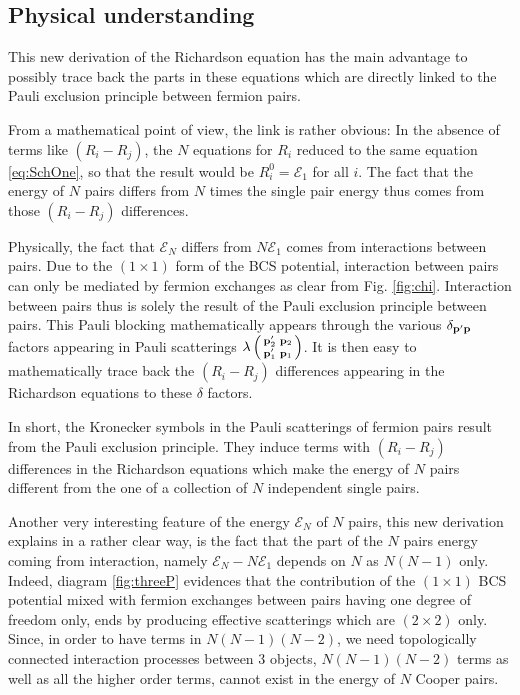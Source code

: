 \documentclass[aps,prb,amsmath,amssymb,preprint,superscriptaddress]{revtex4-1}
\renewcommand{\E}{\ensuremath{\mathcal{E}}}
\begin{document}
\subsection{Physical understanding}
This new derivation of the Richardson equation has the main advantage to possibly trace back the parts in these equations which are directly linked to the Pauli exclusion principle between fermion pairs. 

From a mathematical point of view, the link is rather obvious: In the absence of terms like $(R_i-R_j)$, the $N$ equations for $R_i$ reduced to the same equation \eqref{eq:SchOne}, so that the result would be $R^0_i=\E_1$ for all $i$.  The fact that the energy of $N$ pairs differs from $N$ times the single pair energy thus comes from those $(R_i-R_j)$ differences. 

Physically, the fact that $\E_N$ differs from $N\E_1$ comes from interactions between pairs. Due to the $(1\times1)$ form of the BCS potential, interaction between pairs can only be mediated by fermion exchanges as clear from Fig. \ref{fig:chi}.  Interaction between pairs thus is solely the result of the Pauli exclusion principle between pairs. This Pauli blocking mathematically appears through the various $\delta_{\mathbf{p}'\mathbf{p}}$ factors appearing in Pauli scatterings 
$\lambda\left(\begin{smallmatrix}\mathbf{p}'_2&\mathbf{p}_2\\\mathbf{p}_1'&\mathbf{p}_1\end{smallmatrix}\right)$.  It is then easy to mathematically trace back the  $(R_i-R_j)$ differences appearing in the Richardson equations to these $\delta$ factors. 

In short, the Kronecker symbols in the Pauli scatterings of  fermion pairs result from the Pauli exclusion principle.  They induce terms with $(R_i-R_j)$ differences in the Richardson equations which make the energy of $N$ pairs different from the one of a collection of $N$ independent single pairs. 

Another very interesting feature of the energy $\E_N$ of $N$ pairs, this new derivation explains in a rather clear way, is the fact that the part of the $N$ pairs energy coming from interaction, namely $\E_N-N\E_1$ depends on $N$ as $N(N-1)$ only. Indeed, diagram \ref{fig:threeP} evidences that the contribution of the $(1\times1)$ BCS potential mixed with fermion exchanges between pairs having one degree of freedom only, ends by producing effective scatterings which are $(2\times2)$ only.  Since, in order to have terms in $N(N-1)(N-2)$, we need topologically connected interaction processes between 3 objects, $N(N-1)(N-2)$ terms as well as all the higher order terms, cannot exist in the energy of $N$ Cooper pairs.
\end{document}
